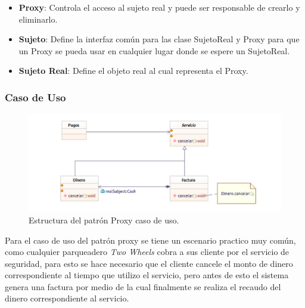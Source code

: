 \begin{itemize}
	\item \textbf{Proxy}: Controla el acceso al sujeto real y puede ser responsable de crearlo y eliminarlo.
	\item \textbf{Sujeto}: Define la interfaz común para las clase SujetoReal y Proxy para que un Proxy se pueda usar en cualquier lugar donde se espere un SujetoReal.
	\item \textbf{Sujeto Real}: Define el objeto real al cual representa el Proxy.
\end{itemize}	


\subsubsection{Caso de Uso}

\begin{figure}[th!]
	\centering
	\includegraphics[width=.8\linewidth]{imagenes/Patrones/Proxy_caso.pdf}
	\caption{Estructura del patrón Proxy caso de uso.\cite{gof}}	
\end{figure}


Para el caso de uso del patrón proxy se tiene un escenario practico muy común, como cualquier parqueadero \textit{Two Wheels} cobra a sus cliente por el servicio de seguridad, para esto se hace necesario que el cliente cancele el monto de dinero correspondiente al tiempo que utilizo el servicio, pero antes de esto el sistema genera una factura por medio de la cual finalmente se realiza el recaudo del dinero correspondiente al servicio.

